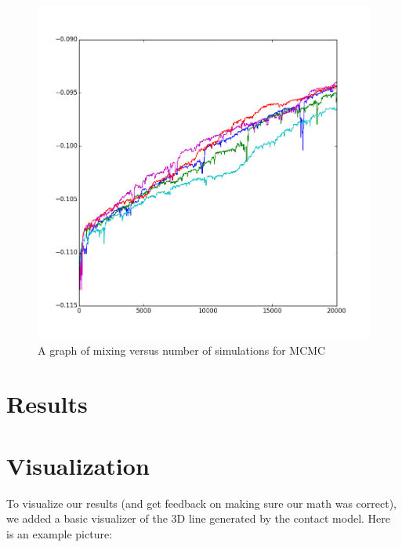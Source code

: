 \documentclass{article}
\begin{document}
\begin{figure}[H]
\begin{center}
\includegraphics[width=\textwidth]{chromo7}
\caption{A graph of mixing versus number of simulations for MCMC}
\label{Fig:mcmc_mixing}
\end{center}
\end{figure}

\section{Results}



\section{Visualization}

To visualize our results (and get feedback on making sure our math was correct), we added a basic visualizer of the 3D line generated by the contact model.  Here is an example picture:
\end{document}
